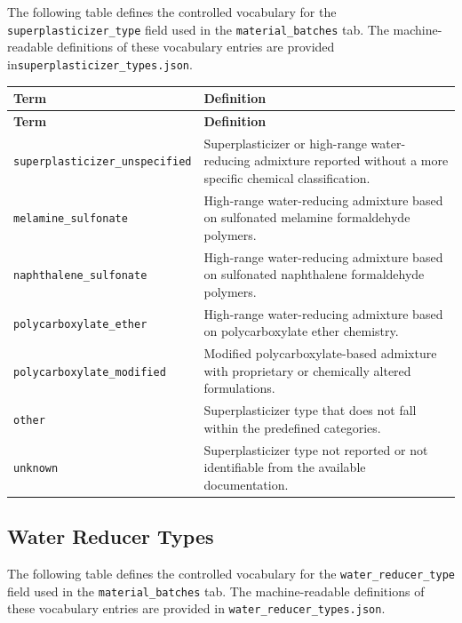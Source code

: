 \documentclass[11pt]{book}
\begin{document}
{The following table defines the controlled vocabulary for the \texttt{superplasticizer\_type} field used in the \texttt{material\_batches} tab. The machine-readable definitions of these vocabulary entries are provided in\texttt{superplasticizer\_types.json}.

\begin{longtable}{p{}p{}}
\hline
\textbf{Term} & \textbf{Definition} \\
\hline
\endfirsthead

\hline
\textbf{Term} & \textbf{Definition} \\
\hline
\endhead

\texttt{superplasticizer\_unspecified} &
Superplasticizer or high-range water-reducing admixture reported without a more specific chemical classification. \\

\texttt{melamine\_sulfonate} &
High-range water-reducing admixture based on sulfonated melamine formaldehyde polymers. \\

\texttt{naphthalene\_sulfonate} &
High-range water-reducing admixture based on sulfonated naphthalene formaldehyde polymers. \\

\texttt{polycarboxylate\_ether} &
High-range water-reducing admixture based on polycarboxylate ether chemistry. \\

\texttt{polycarboxylate\_modified} &
Modified polycarboxylate-based admixture with proprietary or chemically altered formulations. \\

\texttt{other} &
Superplasticizer type that does not fall within the predefined categories. \\

\texttt{unknown} &
Superplasticizer type not reported or not identifiable from the available documentation. \\

\hline
\end{longtable}

\subsection{Water Reducer Types}
\label{vocab:water_reducer_type_list}

The following table defines the controlled vocabulary for the \texttt{water\_reducer\_type} field used in the \texttt{material\_batches} tab. The machine-readable definitions of these vocabulary entries are provided in \texttt{water\_reducer\_types.json}.

}
\end{document}
